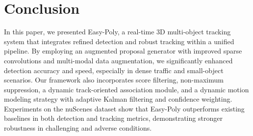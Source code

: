 
\section{Conclusion}
\label{sec:conclusion}

In this paper, we presented Easy-Poly, a real-time 3D multi-object tracking system that integrates refined detection and robust tracking within a unified pipeline. By employing an augmented proposal generator with improved sparse convolutions and multi-modal data augmentation, we significantly enhanced detection accuracy and speed, especially in dense traffic and small-object scenarios. Our framework also incorporates score filtering, non-maximum suppression, a dynamic track-oriented association module, and a dynamic motion modeling strategy with adaptive Kalman filtering and confidence weighting. Experiments on the nuScenes dataset show that Easy-Poly outperforms existing baselines in both detection and tracking metrics, demonstrating stronger robustness in challenging and adverse conditions.